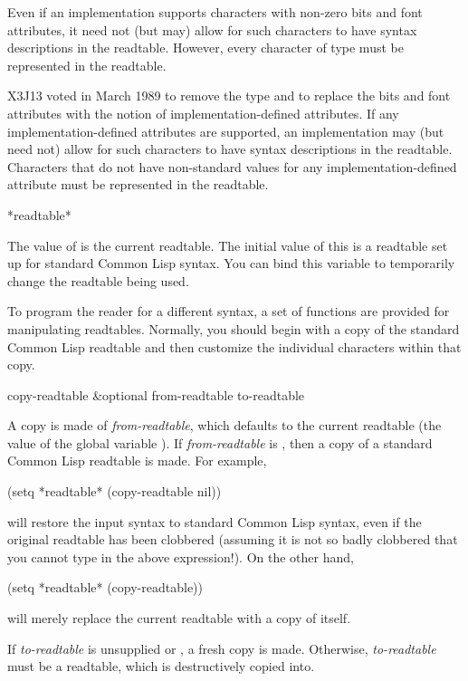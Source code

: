\begin{obsolete}
Even if an implementation supports characters with non-zero bits and font attributes,
it need not (but may) allow for such characters to have syntax
descriptions in the readtable.  However, every character of type
 must be represented in the readtable.
\end{obsolete}

\begin{newer}
X3J13 voted in March 1989 
to remove the type  and to replace the bits and font attributes
with the notion of implementation-defined attributes.
If any implementation-defined attributes are supported, an implementation
may (but need not) allow for such characters to have syntax
descriptions in the readtable.  Characters that do not have non-standard values
for any implementation-defined attribute must be represented in the readtable.
\end{newer}

\begin{defun}[Variable]
*readtable*

The value of  is the current readtable.  The initial
value of this is a readtable set up for standard Common Lisp syntax.
You can bind this variable to temporarily change the readtable being used.
\end{defun}

To program the reader for a different syntax, a set of functions are
provided for manipulating readtables.  Normally, you should begin
with a copy of the standard Common Lisp readtable and then customize
the individual characters within that copy.

\begin{defun}[Function]
copy-readtable &optional from-readtable to-readtable

A copy is made of {\it from-readtable}, which defaults to the current readtable
(the value of the global variable ).  If {\it from-readtable}
is {\false}, then a copy of a standard Common Lisp readtable is made.
For example,
\begin{lisp}
(setq *readtable* (copy-readtable nil))
\end{lisp}
will restore the input syntax to standard Common Lisp syntax, even if
the original readtable has been clobbered (assuming it is not so
badly clobbered that you cannot type in the above expression!).
On the other hand,
\begin{lisp}
(setq *readtable* (copy-readtable))
\end{lisp}
will merely replace the current readtable with a copy of itself.

If {\it to-readtable} is unsupplied or {\false}, a fresh copy is made.  Otherwise,
{\it to-readtable} must be a readtable, which is destructively copied into.
\end{defun}

